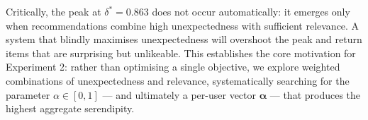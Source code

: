 Critically, the peak at $\delta^* = 0.863$ does not occur automatically: it
emerges only when recommendations combine high unexpectedness with sufficient
relevance.  A system that blindly maximises unexpectedness will overshoot the
peak and return items that are surprising but unlikeable.  This establishes
the core motivation for Experiment 2: rather than optimising a single
objective, we explore weighted combinations of unexpectedness and relevance,
systematically searching for the parameter $\alpha \in [0, 1]$ --- and
ultimately a per-user vector $\boldsymbol{\alpha}$ --- that produces the
highest aggregate serendipity.
